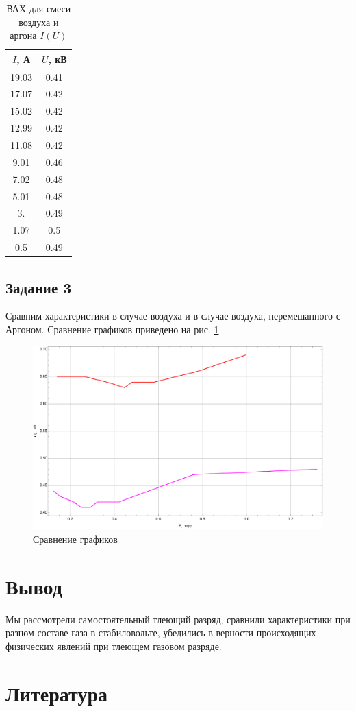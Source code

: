 \documentclass[a4paper, 12pt]{article}
\begin{document}
\begin{table}[h!]
\centering
	\begin{tabular}{|c|c|}
\hline
 $I$, А & $U$, кВ \\
\hline
 19.03 & 0.41 \\
\hline
 17.07 & 0.42 \\
\hline
 15.02 & 0.42 \\
\hline
 12.99 & 0.42 \\
\hline
 11.08 & 0.42 \\
\hline
 9.01 & 0.46 \\
\hline
 7.02 & 0.48 \\
\hline
 5.01 & 0.48 \\
\hline
 3. & 0.49 \\
\hline
 1.07 & 0.5 \\
\hline
 0.5 & 0.49 \\
\hline
\end{tabular}
\caption{ВАХ для смеси воздуха и аргона $I\left(U\right)$}
\end{table}
\newpage
\subsection{Задание 3}
Сравним характеристики в случае воздуха и в случае воздуха, перемешанного с Аргоном. Сравнение графиков приведено на рис. \ref{fig:Graph5}
\begin{figure}[h!]
	\centering
	\includegraphics[scale=0.4]{MyGraph5.pdf}
	\caption{Сравнение графиков}
	\label{fig:Graph5}
\end{figure}
\section{Вывод}
Мы рассмотрели самостоятельный тлеющий разряд, сравнили характеристики при разном составе газа в стабиловольте, убедились в верности происходящих физических явлений при тлеющем газовом разряде.
\section{Литература}
\end{document}
